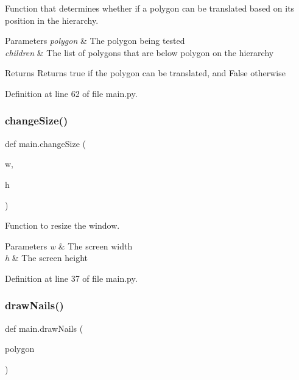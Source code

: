 Function that determines whether if a polygon can be translated based on its position in the hierarchy. 


\begin{DoxyParams}{Parameters}
{\em polygon} & The polygon being tested \\
\hline
{\em children} & The list of polygons that are below polygon on the hierarchy \\
\hline
\end{DoxyParams}
\begin{DoxyReturn}{Returns}
Returns true if the polygon can be translated, and False otherwise 
\end{DoxyReturn}


Definition at line 62 of file main.\+py.

\mbox{\label{namespacemain_a526cfe84f4e80095febf0d3f4b7b5358}} 
\subsubsection{\texorpdfstring{change\+Size()}{changeSize()}}
{\footnotesize\ttfamily def main.\+change\+Size (\begin{DoxyParamCaption}\item[{}]{w,  }\item[{}]{h }\end{DoxyParamCaption})}



Function to resize the window. 


\begin{DoxyParams}{Parameters}
{\em w} & The screen width \\
\hline
{\em h} & The screen height \\
\hline
\end{DoxyParams}


Definition at line 37 of file main.\+py.

\mbox{\label{namespacemain_a020b084aad026564a4c7ee5af1ac6b91}} 
\subsubsection{\texorpdfstring{draw\+Nails()}{drawNails()}}
{\footnotesize\ttfamily def main.\+draw\+Nails (\begin{DoxyParamCaption}\item[{}]{polygon }\end{DoxyParamCaption})}




